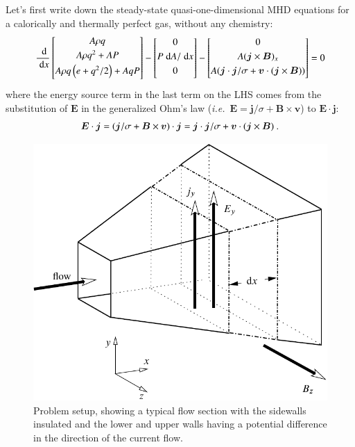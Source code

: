 \documentclass[oneside,10pt,onecolumn]{waflreport}
\newlength\lengthfigure                  %
\renewcommand{\vec}[1]{\bm{#1}}
\newcommand{\ie}{{\it i.e.}}
\newcommand{\ordi}{\; {\rm d}}
\newcommand{\alb}{\vspace{0.1cm}\\} %
\begin{document}
%
Let's
first write down the steady-state quasi-one-dimensional MHD equations for a calorically and thermally
perfect gas, without any chemistry:
%
\begin{equation}
  \frac{\ordi}{\ordi x}
     \left[
      \begin{array}{@{}c@{}}
        A {\rho} q \alb
        A {\rho} q^2 +  A P\alb
        A {\rho} q \left(e+q^2/2\right)+ A q P \alb
      \end{array}
    \right]
  -\left[
      \begin{array}{@{}c@{}}
      0 \alb
      P \ordi A / \ordi x\alb
      0 \alb
      \end{array}
   \right]
  -\left[
      \begin{array}{@{}c@{}}
      0 \alb
      A (\vec{j} \times \vec{B})_x\alb
      A (\vec{j}\cdot \vec{j}/\sigma + \vec{v} \cdot (\vec{j}\times \vec{B}))\alb
      \end{array}
   \right]=0
\end{equation}
%
where the energy source term in the last term on the LHS comes from the substitution
of $\vec{E}$ in the generalized Ohm's law (\ie\ $\vec{E}=\vec{j}/\sigma + \vec{B} \times \vec{v}$)
to $\vec{E} \cdot \vec{j}$:
%
\begin{displaymath}
  \vec{E} \cdot \vec{j} = (\vec{j}/\sigma + \vec{B} \times \vec{v}) \cdot \vec{j}\alb
    =\vec{j} \cdot \vec{j} / \sigma + \vec{v} \cdot (\vec{j} \times \vec{B})~.
\end{displaymath}
%
\begin{figure}
   \center
   \includegraphics[width=4.0\lengthfigure]{setup.pdf}
\caption{Problem setup, showing a typical flow section with the sidewalls
         insulated and the lower and upper walls having a potential difference in the direction of
	 the current flow.}
\label{fig:setup}
\end{figure}
\end{document}
